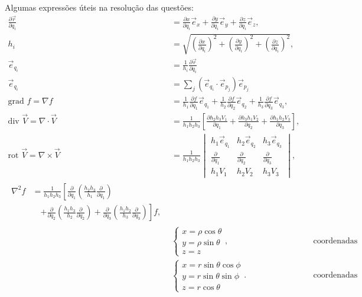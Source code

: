 \documentclass[a4paper,12pt, leqno, answers]{exam}
\newcommand{\devp}[2]{\frac{\partial #1}{\partial #2}}
\newcommand{\grad}{\mbox{grad }}
\newcommand{\diver}{\mbox{div }}
\newcommand{\rot}{\mbox{rot }}
\begin{document}
\thispagestyle{empty}

\newpage
\setcounter{page}{1}
Algumas express\~{o}es \'{u}teis na resolu\c{c}\~{a}o das quest\~{o}es:
\begin{align}
    \devp{\vec{r}}{q_i} &= \devp{x}{q_i} \vec{e}_x + \devp{y}{q_i} \vec{e}_y + \devp{z}{q_i} \vec{e}_z,
    \label{eq:vetor_tangente} \\
    h_i &= \sqrt{\left(\devp{x}{q_i}\right)^2 + \left(\devp{y}{q_i}\right)^2 + \left(\devp{z}{q_i}\right)^2},
    \label{eq:fator_escala} \\
    \vec{e}_{q_i} &= \frac{1}{h_i} \devp{\vec{r}}{q_i}
    \label{eq:vetor_tang_unit} \\
    \vec{e}_{q_i} &= \sum_j \left( \vec{e}_{q_i} \cdot \vec{e}_{p_j} \right) \vec{e}_{p_j}
    \label{eq:vetor_mud_coor} \\
    \grad f = \nabla f &= \frac{1}{h_1} \devp{f}{q_1} \vec{e}_{q_1} + \frac{1}{h_2} \devp{f}{q_2} \vec{e}_{q_2} + \frac{1}{h_3} \devp{f}{q_3} \vec{e}_{q_3},
    \label{eq:grad} \\
    \diver \vec{V} = \nabla \cdot \vec{V} &= \frac{1}{h_1 h_2 h_3} \left[\devp{h_2 h_3 V_1}{q_1} + \devp{h_3 h_1 V_2}{q_2} + \devp{h_1 h_2 V_3}{q_3}\right],
    \label{eq:div} \\
    \rot \vec{V} = \nabla \times \vec{V} &= \frac{1}{h_1 h_2 h_3} \begin{vmatrix}
        h_1 \vec{e}_{q_1} & h_2 \vec{e}_{q_2} & h_3 \vec{e}_{q_3} \\
        \devp{}{q_1}      & \devp{}{q_2}      & \devp{}{q_3}      \\
        h_1 V_1           & h_2 V_2           & h_3 V_3           
    \end{vmatrix},
    \label{eq:rot} \\
    \begin{split}
        \nabla^2 f &= \frac{1}{h_1 h_2 h_3} \left[\devp{}{q_1}\left(\frac{h_2 h_3}{h_1} \devp{}{q_1}\right)\right. \\ &\quad\left. + \devp{}{q_2}\left(\frac{h_1 h_3}{h_2} \devp{}{q_2}\right) + \devp{}{q_3}\left(\frac{h_1 h_2}{h_3} \devp{}{q_3}\right)\right] f,
    \end{split}
    \label{eq:laplaciano} \\
    & \begin{cases}
        x = \rho \cos \theta \\
        y = \rho \sin \theta \\
        z = z
    \end{cases}, && \text{coordenadas cil\'{i}ndricas}
    \label{eq:coor_cil} \\
    & \begin{cases}
        x = r \sin \theta \cos \phi \\
        y = r \sin \theta \sin \phi \\
        z = r \cos \theta
    \end{cases}. && \text{coordenadas esf\'{e}ricas}
    \label{eq:coor_esf}
\end{align}
\end{document}
